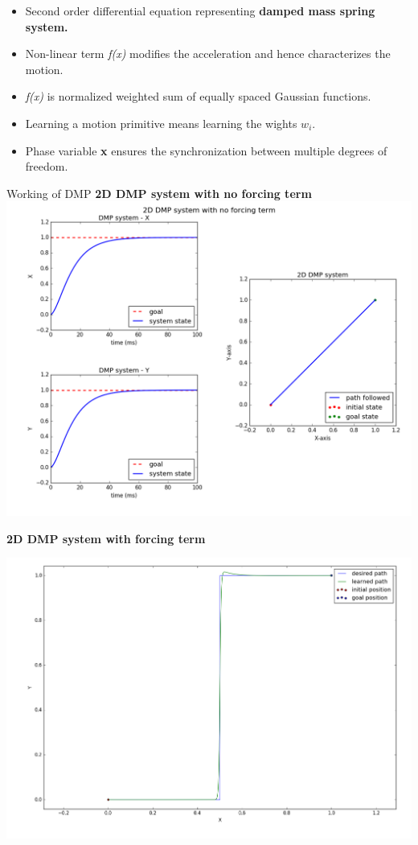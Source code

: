 \documentclass{beamer}
\begin{document}
	
	\begin{frame}
		\begin{itemize}
			\item Second order differential equation representing \textbf{damped mass spring system.} 
			\item Non-linear term \color{red} \textit{f(x)} \color{black} modifies the acceleration and hence characterizes the motion. 
			\item \color{red} \textit{f(x)} \color{black} is normalized weighted sum of equally spaced Gaussian functions. 
			\item Learning a motion primitive means learning the wights 	\textbf{\textit{$w_{i}$}}.
			\item Phase variable \textbf{x} ensures the synchronization between multiple degrees of freedom.  
		\end{itemize}
	\end{frame}

	\begin{frame}{Working of DMP}
		\centering
		\textbf{2D DMP system with no forcing term}
		\includegraphics[scale=0.3]{images/dmp_no_f}
	\end{frame}
	
	\begin{frame}
		\centering
		\textbf{2D DMP system with forcing term}

		\includegraphics[width=\textwidth]{images/step_f}
	\end{frame}
	
\end{document}
